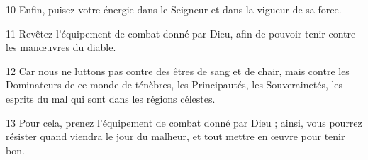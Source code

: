 
10 Enfin, puisez votre énergie dans le Seigneur et dans la vigueur de sa force.

11 Revêtez l’équipement de combat donné par Dieu, afin de pouvoir tenir contre les manœuvres du diable.

12 Car nous ne luttons pas contre des êtres de sang et de chair, mais contre les Dominateurs de ce monde de ténèbres, les Principautés, les Souverainetés, les esprits du mal qui sont dans les régions célestes.

13 Pour cela, prenez l’équipement de combat donné par Dieu ; ainsi, vous pourrez résister quand viendra le jour du malheur, et tout mettre en œuvre pour tenir bon.